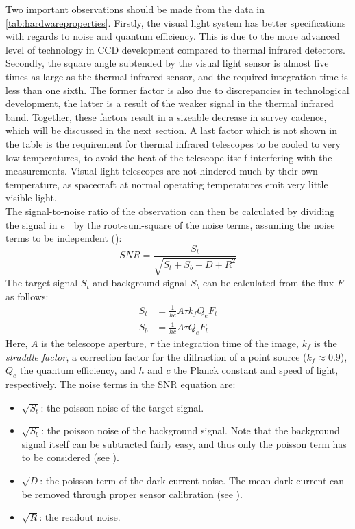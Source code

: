 Two important observations should be made from the data in \autoref{tab:hardwareproperties}. Firstly, the visual light system has better specifications with regards to noise and quantum efficiency. This is due to the more advanced level of technology in CCD development compared to thermal infrared detectors. Secondly, the square angle subtended by the visual light sensor is almost five times as large as the thermal infrared sensor, and the required integration time is less than one sixth. The former factor is also due to discrepancies in technological development, the latter is a result of the weaker signal in the thermal infrared band. Together, these factors result in a sizeable decrease in survey cadence, which will be discussed in the next section. A last factor which is not shown in the table is the requirement for thermal infrared telescopes to be cooled to very low temperatures, to avoid the heat of the telescope itself interfering with the measurements. Visual light telescopes are not hindered much by their own temperature, as spacecraft at normal operating temperatures emit very little visible light. \\

The signal-to-noise ratio of the observation can then be calculated by dividing the signal in $e^-$ by the root-sum-square of the noise terms, assuming the noise terms to be independent (\cite{DetectionAndTracking}):
\begin{equation}
 SNR = \frac{S_t}{\sqrt{S_t + S_b + D + R^2}}
\end{equation}
The target signal $S_t$ and background signal $S_b$ can be calculated from the flux $F$ as follows:
\begin{align}
 S_t &= \frac{1}{hc}A \tau k_f Q_e F_t \\
 S_b &= \frac{1}{hc}A \tau Q_e F_b
\end{align}
Here, $A$ is the telescope aperture, $\tau$ the integration time of the image, $k_f$ is the \textit{straddle factor}, a correction factor for the diffraction of a point source ($k_f \approx 0.9$), $Q_e$ the quantum efficiency, and $h$ and $c$ the Planck constant and speed of light, respectively. The noise terms in the SNR equation are:
\begin{itemize}
 \item $\sqrt{S_t}$: the poisson noise of the target signal.
 \item $\sqrt{S_b}$: the poisson noise of the background signal. Note that the background signal itself can be subtracted fairly easy, and thus only the poisson term has to be considered (see \cite{StarRemoval}).
 \item $\sqrt{D}$: the poisson term of the dark current noise. The mean dark current can be removed through proper sensor calibration (see \cite{OpNav}).
 \item $\sqrt{R}$: the readout noise.
\end{itemize}

